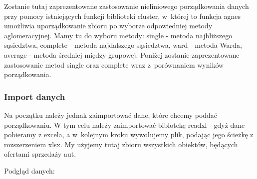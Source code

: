 \documentclass[12pt,a4paper]{report}
\begin{document}
{%


Zostanie tutaj zaprezentowane zastosowanie nieliniowego porządkowania
danych przy pomocy istniejących funkcji biblioteki cluster, w~której to
funkcja agnes umożliwia uporządkowanie zbioru po wyborze
odpowiedniej metody aglomeracyjnej. Mamy tu do wyboru metody: single -
metoda najbliższego sąsiedztwa, complete - metoda najdalszego
sąsiedztwa, ward - metoda Warda, average - metoda średniej między
grupowej. Poniżej zostanie zaprezentowane zastosowanie metod single oraz
complete wraz z~porównaniem wyników porządkowania.

\subsubsection{Import danych}\label{import-danych}

Na początku należy jednak zaimportować dane, które chcemy poddać porządkowaniu.
W tym celu należy zaimportować biblotekę readxl - gdyż dane pobieramy z
excela, a w~kolejnym kroku wywołujemy plik, podając jego ścieżkę 
z rozszerzeniem xlsx. My użyjemy tutaj zbioru wszystkich obiektów,
będących ofertami sprzedaży aut.

\begin{Shaded}
\begin{Highlighting}[]
\StringTok{ }\NormalTok{(}\NormalTok{, }
                            \NormalTok{)}
\end{Highlighting}
\end{Shaded}

Podgląd danych:

\begin{Shaded}
\begin{Highlighting}[]
\end{Highlighting}
\end{Shaded}

}
\end{document}
